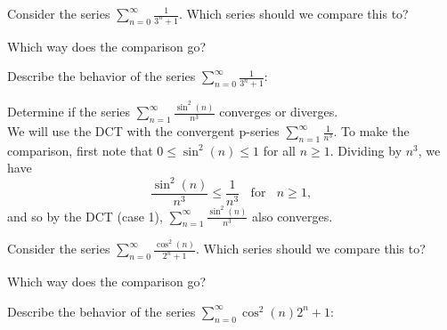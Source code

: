 \documentclass{ximera}
\begin{document}
\begin{problem}
Consider the series $\sum_{n=0}^\infty \frac{1}{3^n + 1}$.
Which series should we compare this to?

\begin{multipleChoice}
\end{multipleChoice}

Which way does the comparison go?
\begin{multipleChoice}
\end{multipleChoice}

Describe the behavior of the series $\sum_{n=0}^\infty \frac{1}{3^n + 1}:$
\begin{multipleChoice}
\end{multipleChoice}

\end{problem}



\begin{example}[Convergence] %
Determine if the series $\sum_{n=1}^\infty \frac{\sin^2(n)}{n^3}$ converges or diverges.\\
We will use the DCT with the convergent p-series $\sum_{n=1}^\infty \frac{1}{n^3}$. 
To make the comparison, first note that $0 \leq \sin^2(n) \leq 1$ for all $n \geq 1$. Dividing by $n^3$,
we have 
\[
\frac{\sin^2(n)}{n^3} \leq \frac{1}{n^3} \; \; \text{ for } \; \; n \geq 1,
\]
and so by the DCT (case 1), $\sum_{n=1}^\infty \frac{\sin^2(n)}{n^3}$ also converges.
\end{example}




\begin{problem}
Consider the series $\sum_{n=0}^\infty \frac{\cos^2(n)}{2^n + 1}$.
Which series should we compare this to?

\begin{multipleChoice}
\end{multipleChoice}

Which way does the comparison go?
\begin{multipleChoice}
\end{multipleChoice}

Describe the behavior of the series $\sum_{n=0}^\infty {\cos^2(n)}{2^n + 1}:$
\begin{multipleChoice}
\end{multipleChoice}

\end{problem}
\end{document}

